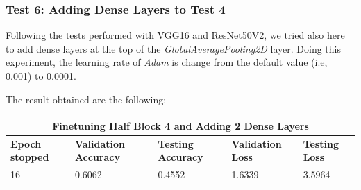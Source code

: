 \subsubsection{Test 6: Adding Dense Layers to Test 4}
Following the tests performed with VGG16 and ResNet50V2, we tried also here to add dense layers at the top of the \textit{GlobalAveragePooling2D} layer.  Doing this experiment, the learning rate of \textit{Adam} is change from the default value (i.e, 0.001) to 0.0001.

\noindent The result obtained are the following:

\medskip

\begin{tabular}{ |p{2cm}|p{2cm}|p{2cm}|p{2cm}|p{2cm}|  }
\hline
\multicolumn{5}{|c|}{Finetuning Half Block 4 and Adding 2 Dense Layers} \\
\hline
\textbf{Epoch stopped} & \textbf{Validation Accuracy} & \textbf{Testing Accuracy} & \textbf{Validation Loss} & \textbf{Testing Loss} \\
\hline
16 & 0.6062 & 0.4552 & 1.6339 & 3.5964\\
\hline
\end{tabular}

